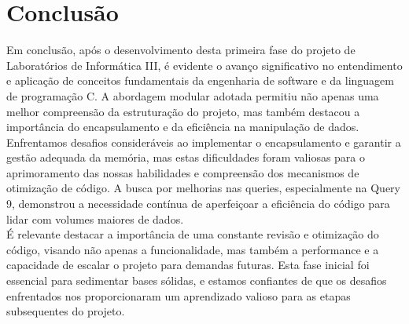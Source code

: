 \documentclass[12pt,a4paper]{article}
\begin{document}
        
    \section{Conclusão}

    \hspace{0,6cm}Em conclusão, após o desenvolvimento desta primeira fase do projeto de Laboratórios de Informática III, é evidente o avanço significativo no entendimento e aplicação de conceitos fundamentais da engenharia de software e da linguagem de programação C. A abordagem modular adotada permitiu não apenas uma melhor compreensão da estruturação do projeto, mas também destacou a importância do encapsulamento e da eficiência na manipulação de dados.\\

    Enfrentamos desafios consideráveis ao implementar o encapsulamento e garantir a gestão adequada da memória, mas estas dificuldades foram valiosas para o aprimoramento das nossas habilidades e compreensão dos mecanismos de otimização de código. A busca por melhorias nas queries, especialmente na Query 9, demonstrou a necessidade contínua de aperfeiçoar a eficiência do código para lidar com volumes maiores de dados.\\

    É relevante destacar a importância de uma constante revisão e otimização do código, visando não apenas a funcionalidade, mas também a performance e a capacidade de escalar o projeto para demandas futuras. Esta fase inicial foi essencial para sedimentar bases sólidas, e estamos confiantes de que os desafios enfrentados nos proporcionaram um aprendizado valioso para as etapas subsequentes do projeto.
	
	\newpage
        
\end{document}
